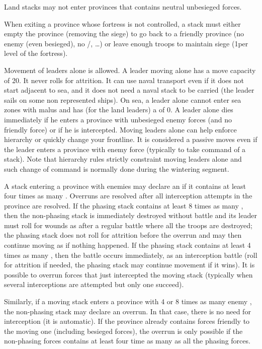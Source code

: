 Land stacks may not enter provinces that contains neutral unbesieged forces.

When exiting a province whose fortress is not controlled, a stack must either
empty the province (removing the siege) to go back to a friendly province (no
enemy (even besieged), no \REVOLT/\REBELLION, \ldots) or leave enough troops
to maintain siege (1\LD per level of the fortress).

Movement of leaders alone is allowed. A leader moving alone has a move
capacity of 20\MP. It never rolls for attrition. It can use naval transport
even if it does not start adjacent to sea, and it does not need a naval stack
to be carried (the leader sails on some non represented ships). On sea, a
leader alone cannot enter sea zones with malus and has (for the land leaders)
a \Man of 0. A leader alone dies immediately if he enters a province with
unbesieged enemy forces (and no friendly force) or if he is
intercepted. Moving leaders alone can help enforce hierarchy or quickly change
your frontline. It is considered a passive moves even if the leader enters a
province with enemy force (typically to take command of a stack). Note that
hierarchy rules strictly constraint moving leaders alone and such change of
command is normally done during the wintering segment.

A stack entering a province with enemies may declare an  if it
contains at least four times as many \LD. Overruns are resolved after all
interception attempts in the province are resolved. If the phasing stack
contains at least 8 times as many \LD, then the non-phasing stack is
immediately destroyed without battle and its leader must roll for wounds as
after a regular battle where all the troops are destroyed; the phasing stack
does not roll for attrition before the overrun and may then continue moving as
if nothing happened. If the phasing stack contains at least 4 times as many
\LD, then the battle occurs immediately, as an interception battle (roll for
attrition if needed, the phasing stack may continue movement if it wins). It
is possible to overrun forces that just intercepted the moving stack
(typically when several interceptions are attempted but only one succeed).

Similarly, if a moving stack enters a province with 4 or 8 times as many enemy
\LD, the non-phasing stack may declare an overrun. In that case, there is no
need for interception (it is automatic). If the province already contains
forces friendly to the moving one (including besieged forces), the overrun is
only possible if the non-phasing forces contains at least four time as many
\LD as all the phasing forces.

